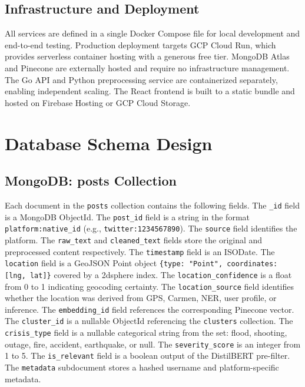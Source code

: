 \documentclass[conference]{IEEEtran}
\begin{document}
\subsection{Infrastructure and Deployment}

All services are defined in a single Docker Compose file for local development
and end-to-end testing. Production deployment targets GCP Cloud Run, which
provides serverless container hosting with a generous free tier. MongoDB Atlas
and Pinecone are externally hosted and require no infrastructure management.
The Go API and Python preprocessing service are containerized separately,
enabling independent scaling. The React frontend is built to a static bundle
and hosted on Firebase Hosting or GCP Cloud Storage.

\section{Database Schema Design}

\subsection{MongoDB: posts Collection}

Each document in the \texttt{posts} collection contains the following fields.
The \texttt{\_id} field is a MongoDB ObjectId. The \texttt{post\_id} field is
a string in the format \texttt{platform:native\_id}
(e.g., \texttt{twitter:1234567890}). The \texttt{source} field identifies
the platform. The \texttt{raw\_text} and \texttt{cleaned\_text} fields store
the original and preprocessed content respectively. The \texttt{timestamp}
field is an ISODate. The \texttt{location} field is a GeoJSON Point object
\texttt{\{type: "Point", coordinates: [lng, lat]\}} covered by a 2dsphere index.
The \texttt{location\_confidence} is a float from 0 to 1 indicating geocoding
certainty. The \texttt{location\_source} field identifies whether the location
was derived from GPS, Carmen, NER, user profile, or inference. The
\texttt{embedding\_id} field references the corresponding Pinecone vector.
The \texttt{cluster\_id} is a nullable ObjectId referencing the
\texttt{clusters} collection. The \texttt{crisis\_type} field is a nullable
categorical string from the set: flood, shooting, outage, fire, accident,
earthquake, or null. The \texttt{severity\_score} is an integer from 1 to 5.
The \texttt{is\_relevant} field is a boolean output of the DistilBERT pre-filter.
The \texttt{metadata} subdocument stores a hashed username and platform-specific
metadata.
\end{document}
